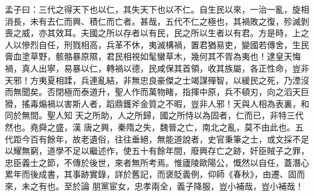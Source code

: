 
\begin{pinyinscope}

 孟子曰：三代之得天下也以仁，其失天下也以不仁。自生民以來，一治一亂，旋相消長，未有去仁而興、積仁而亡者。甚哉，五代不仁之極也，其禍敗之復，殄滅剝喪之威，亦其效耳。夫國之所以存者以有民，民之所以生者以有君。方是時，上之人以慘烈自任，刑戮相高，兵革不休，夷滅構禍，置君猶易吏，變國若傳舍，生民膏血塗草野，骸骼暴原隰，君民相視如髦蠻草木，幾何其不胥為夷也！逮皇天悔禍，真人出寧，易暴以仁，轉禍以德，民咸保其首領，收其族屬，各正性命，豈非天邪！方夷夏相蹂，兵連亂結，非無忠良豪傑之士竭謀殫智，以緩民之死，乃湮沒而無聞矣。否閉極而泰道升，聖人作而萬物睹，指揮中原，兵不頓刃，向之滔天巨猾，搖毒煽禍以害斯人者，蹈鼎鑊斧金質之不暇，豈非人邪！天與人相為表裏，和同於無間。聖人知
 天之所助，人之所歸，國之所恃以為固者，仁而已，非特三代然也。堯舜之盛，漢
 唐之興，秦隋之失，魏晉之亡，南北之亂，莫不由此也。五代距今百有餘年，故老遺俗，往往垂絕，無能道說者，史官秉筆之士，或文採不足以耀無窮，道學不足以繼述作，使五十有餘年間，廢興存亡之跡，奸臣賊子之罪，忠臣義士之節，不傳於後世，來者無所考焉。惟廬陵歐陽公，慨然以自任，蓋潛心累年而後成書，其事跡實錄，詳於舊記，而褒貶義例，仰師《春秋》，由遷、固而來，未之有也。至於論
 朋黨宦女，忠孝兩全，義子降服，豈小補哉，豈小補哉！



\end{pinyinscope}